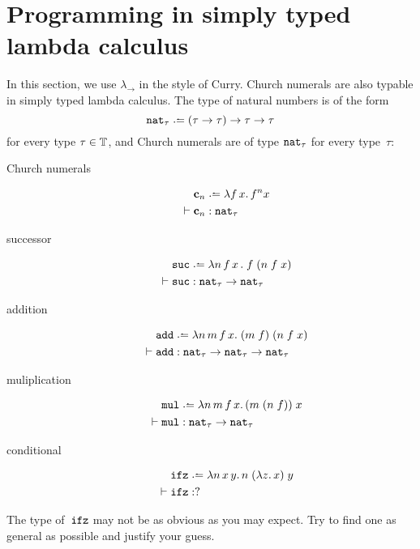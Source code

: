 \section{Programming in simply typed lambda calculus}
In this section, we use $\lambda_\to$ in the style of Curry.  
Church numerals are also typable in simply typed lambda calculus.
The type of natural numbers is of the form
\[
  \nat_\tau \defeq (\tau \to \tau) \to \tau \to \tau
\]
for every type $\tau \in \mathbb{T}$, and Church
numerals are of type $\mathtt{nat}_\tau$ for every type~$\tau$:
  \begin{description}
    \item[Church numerals]
      \begin{align*}
        & \bc_n \defeq \lambda f\,x.\,
        f^n x \\
        \vdash{} & \bc_n : \nat_\tau
      \end{align*}
    \item[successor]
      \begin{align*}
        & \suc \defeq \lambda n \,f\,x\,.\;f\;(n\;f\;x) \\
        \vdash{} & \suc : \nat_\tau \to \nat_\tau
      \end{align*}
    \item[addition]
      \begin{align*}
        & \add \defeq \lambda n\,m\,f\,x.\; (m\;f)\;(n\;f\;x) \\
        \vdash{} & \add : \nat_\tau \to \nat_\tau \to \nat_\tau
      \end{align*}
    \item[muliplication] 
      \begin{align*}
        & \mul \defeq \lambda n\,m\,f\,x.\, (m\;(n\;f))\;x\\
      \vdash{} & \mul : \nat_\tau \to \nat_\tau
      \end{align*}
    \item[conditional]
      \begin{align*}
        & \ifz \defeq \lambda n\,x\,y.\, n\;(\lambda z.\, x)\;y\\
        \vdash {} & \ifz : ?
      \end{align*}
  \end{description}
The type of~$\mathtt{ifz}$ may not be as obvious as you may expect.
Try to find one as general as possible and justify your guess.

